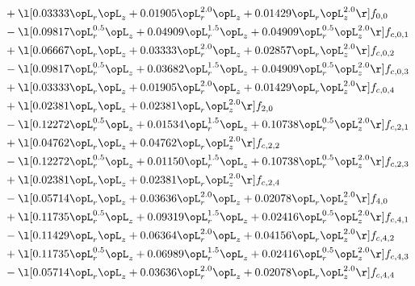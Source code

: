 \begin{alignat}{2}
& + \l[  0.03333 \opL_r \opL_z +  0.01905 \opL_r^{2.0} \opL_z +  0.01429 \opL_r \opL_z^{2.0}  \r] f_{0,0} \nonumber \\ 
& - \l[  0.09817 \opL_r^{0.5} \opL_z +  0.04909 \opL_r^{1.5} \opL_z +  0.04909 \opL_r^{0.5} \opL_z^{2.0}  \r] f_{c,0,1} \nonumber \\ 
& + \l[  0.06667 \opL_r \opL_z +  0.03333 \opL_r^{2.0} \opL_z +  0.02857 \opL_r \opL_z^{2.0}  \r] f_{c,0,2} \nonumber \\ 
& - \l[  0.09817 \opL_r^{0.5} \opL_z +  0.03682 \opL_r^{1.5} \opL_z +  0.04909 \opL_r^{0.5} \opL_z^{2.0}  \r] f_{c,0,3} \nonumber \\ 
& + \l[  0.03333 \opL_r \opL_z +  0.01905 \opL_r^{2.0} \opL_z +  0.01429 \opL_r \opL_z^{2.0}  \r] f_{c,0,4} \nonumber \\ 
& + \l[  0.02381 \opL_r \opL_z +  0.02381 \opL_r \opL_z^{2.0}  \r] f_{2,0} \nonumber \\ 
& - \l[  0.12272 \opL_r^{0.5} \opL_z +  0.01534 \opL_r^{1.5} \opL_z +  0.10738 \opL_r^{0.5} \opL_z^{2.0}  \r] f_{c,2,1} \nonumber \\ 
& + \l[  0.04762 \opL_r \opL_z +  0.04762 \opL_r \opL_z^{2.0}  \r] f_{c,2,2} \nonumber \\ 
& - \l[  0.12272 \opL_r^{0.5} \opL_z +  0.01150 \opL_r^{1.5} \opL_z +  0.10738 \opL_r^{0.5} \opL_z^{2.0}  \r] f_{c,2,3} \nonumber \\ 
& + \l[  0.02381 \opL_r \opL_z +  0.02381 \opL_r \opL_z^{2.0}  \r] f_{c,2,4} \nonumber \\ 
& - \l[  0.05714 \opL_r \opL_z +  0.03636 \opL_r^{2.0} \opL_z +  0.02078 \opL_r \opL_z^{2.0}  \r] f_{4,0} \nonumber \\ 
& + \l[  0.11735 \opL_r^{0.5} \opL_z +  0.09319 \opL_r^{1.5} \opL_z +  0.02416 \opL_r^{0.5} \opL_z^{2.0}  \r] f_{c,4,1} \nonumber \\ 
& - \l[  0.11429 \opL_r \opL_z +  0.06364 \opL_r^{2.0} \opL_z +  0.04156 \opL_r \opL_z^{2.0}  \r] f_{c,4,2} \nonumber \\ 
& + \l[  0.11735 \opL_r^{0.5} \opL_z +  0.06989 \opL_r^{1.5} \opL_z +  0.02416 \opL_r^{0.5} \opL_z^{2.0}  \r] f_{c,4,3} \nonumber \\ 
& - \l[  0.05714 \opL_r \opL_z +  0.03636 \opL_r^{2.0} \opL_z +  0.02078 \opL_r \opL_z^{2.0}  \r] f_{c,4,4} \nonumber \\ 
\end{alignat} 



